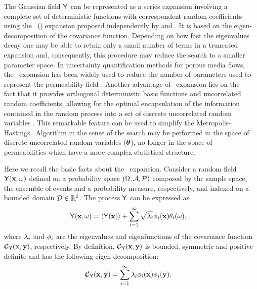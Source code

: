 The Gaussian field $\mathsf{Y}$ can be represented as a series expansion involving a complete set of deterministic functions with correspondent random coefficients using the \KL\ (\kl) expansion proposed independently by \cite{karhunen46} and \cite{loeve55}.
It is based on the eigen-decomposition of the covariance function.
Depending on how fast the eigenvalues decay one may be able to  retain only a small number of terms in a truncated expansion and, consequently, this procedure may reduce the search to a smaller parameter space.
In uncertainty quantification methods for porous media flows, the \kl\ expansion has been widely used to reduce the number of parameters used to represent the permeability field \citep{efendiev05,efendiev2006,das10,mondal10,ginting11,ginting12}.
Another advantage of \kl\ expansion lies on the fact that it provides orthogonal deterministic basis functions and uncorrelated random coefficients, allowing for the optimal encapsulation of the information contained in the random process into a set of discrete uncorrelated random variables \citep{GhanemSpanos}.
This remarkable feature can be used to simplify the Metropolis-Hastings \mcmc\ Algorithm in the sense of the search may be performed in the space of discrete uncorrelated random variables ($\boldsymbol{\theta}$), no longer in the space of permeabilities which have a more complex statistical structure.

Here we recall the basic facts about the \KL\ expansion.
Consider a random field $\mathsf{Y}(\mathbf{x},\omega)$ defined on a probability space $(\Omega,\mathcal{A},\mathcal{P})$ composed by the sample space, the ensemble of events and a probability measure, respectively, and indexed on a bounded domain $\mathcal{D} \in \mathbb{R}^{3}$.
The process $\mathsf{Y}$ can be expressed as
%
\begin{equation}
  \mathsf{Y}(\mathbf{x},\omega) = \langle {\mathsf{Y}(\mathbf{x})} \rangle +\sum_{i=1}^{\infty}\sqrt{\lambda_{i}} \phi_{i}(\mathbf{x})
\theta_{i}(\omega),
\label{kl}
\end{equation}
%
\noindent where $\lambda_{i}$ and $\phi_{i}$ are the eigenvalues and eigenfunctions of the covariance function ${\boldmath{\mbox{$\mathcal{C}$}}}_{\mathsf{Y}}(\mathbf{x}, \mathbf{y})$, respectively.
By definition, ${\boldmath{\mbox{$\mathcal{C}$}}}_{\mathsf{Y}}(\mathbf{x}, \mathbf{y})$ is bounded, symmetric and positive definite and has the following eigen-decomposition:
%
\begin{equation*}
  {\boldmath{\mbox{$\mathcal{C}$}}}_{\mathsf{Y}}(\mathbf{x}, \mathbf{y}) = \sum_{i=1}^{\infty} \lambda_{i}\phi_{i}(\mathbf{x})\phi_{i}(\mathbf{y}).
\label{klcov}
\end{equation*}
%

